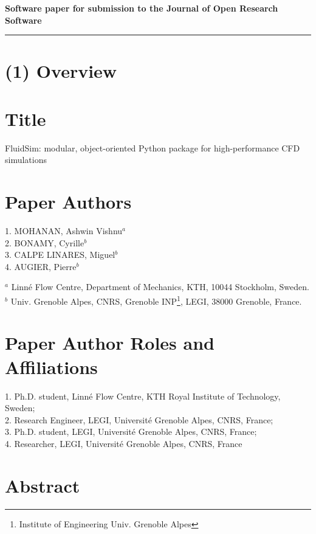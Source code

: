 \documentclass{../jors}
\begin{document}
{\bf Software paper for submission to the Journal of Open Research Software} \\

\rule{\textwidth}{1pt}

\section*{(1) Overview}

\vspace{0.5cm}

\section*{Title}

FluidSim: modular, object-oriented Python package for high-performance CFD
simulations

\section*{Paper Authors}

1. MOHANAN, Ashwin Vishnu$^a$ \\
2. BONAMY, Cyrille$^b$ \\
3. CALPE LINARES, Miguel$^b$ \\
4. AUGIER, Pierre$^b$

\smallskip

$^a$ Linn\'e Flow Centre, Department of Mechanics, KTH, 10044 Stockholm, Sweden.\\
$^b$ Univ. Grenoble Alpes, CNRS, Grenoble INP\footnote{Institute of Engineering
Univ. Grenoble Alpes}, LEGI, 38000 Grenoble, France.

\section*{Paper Author Roles and Affiliations}
1. Ph.D. student, Linn\'e Flow Centre, KTH Royal Institute of Technology,
Sweden; \\
2. Research Engineer, LEGI, Universit\'e Grenoble Alpes, CNRS, France; \\
3. Ph.D. student, LEGI, Universit\'e Grenoble Alpes, CNRS, France; \\
4. Researcher, LEGI, Universit\'e Grenoble Alpes, CNRS, France

\section*{Abstract}
\end{document}
